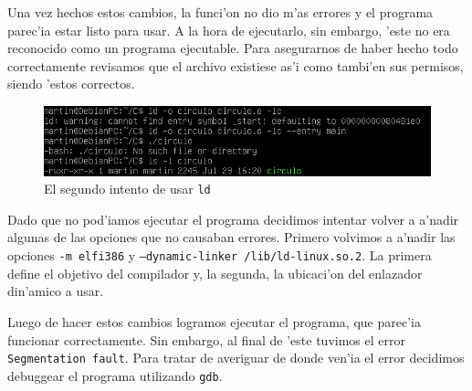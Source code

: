 \documentclass[11pt]{article}
\begin{document}
		
		Una vez hechos estos cambios, la funci'on no dio m'as errores y el programa parec'ia estar listo para usar. A la hora de ejecutarlo, sin embargo, 'este no era reconocido como un programa ejecutable. Para asegurarnos de haber hecho todo correctamente revisamos que el archivo existiese as'i como tambi'en sus permisos, siendo 'estos correctos.
		
		\begin{figure}[H]
			\centering
			\includegraphics[width=.9\linewidth]{Images/Seccion 1/S1 parte seis}
			\caption{El segundo intento de usar \texttt{ld}}
			\label{fig:second-ld-attempt}
		\end{figure}
		
		Dado que no pod'iamos ejecutar el programa decidimos intentar volver a a'nadir algunas de las opciones que no causaban errores. Primero volvimos a a'nadir las opciones \texttt{-m elf\textunderscore\/i386} y \texttt{--dynamic-linker /lib/ld-linux.so.2}. La primera define el objetivo del compilador\footnotemark\/ y, la segunda, la ubicaci'on del enlazador din'amico\footnotemark\/ a usar.
		
		
		Luego de hacer estos cambios logramos ejecutar el programa, que parec'ia funcionar correctamente. Sin embargo, al final de 'este tuvimos el error \texttt{Segmentation fault}. Para tratar de averiguar de donde ven'ia el error decidimos debuggear el programa utilizando \texttt{gdb}.
		
\end{document}
